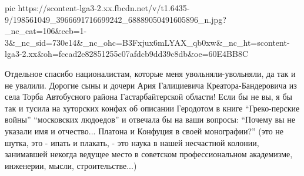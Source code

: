 \ifcmt
  pic https://scontent-lga3-2.xx.fbcdn.net/v/t1.6435-9/198561049_3966691716699242_68889050491605896_n.jpg?_nc_cat=106&ccb=1-3&_nc_sid=730e14&_nc_ohc=B3Fxjux6mLYAX_qb0xw&_nc_ht=scontent-lga3-2.xx&oh=fccad2e82851255c07afdcb9dd39c8db&oe=60E4BB8C
\fi

Отдельное спасибо националистам, которые меня увольняли-увольняли, да так и не
увалили. Дорогие сыны и дочери Ария Галициевича Креатора-Бандеровича из села
Торба Автобусного района Гастарбайтерской области!  Если бы не вы, я бы так и
тусила на хуторских конфах об описании Геродотом в книге \enquote{Греко-перские
войны} \enquote{московских людоедов} и отвечала бы на ваши вопросы:
\enquote{Почему вы не указали имя и отчество... Платона и Конфуция в своей
монографии?} (это не шутка, это - ипать и плакать, - это наука в нашей
несчастной колонии, занимавшей некогда ведущее место в советском
профессиональном академизме, инженерии, мысли, строительстве...)
